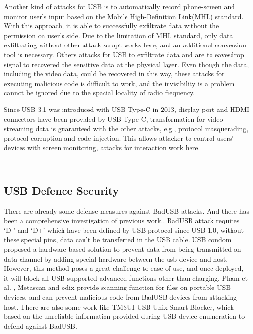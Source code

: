 Another kind of attacks for USB \cite{JFC} is to automatically record phone-screen and monitor user's input based on  the Mobile High-Definition Link(MHL) standard. With this approach, it is able to successfully exfiltrate data without the permission on user's side. Due to the limitation of MHL standard, only data exfiltrating without other attack scropt works here, and an additional conversion tool is necessary. Others attacks for USB to exfiltrate data\cite{smartphone}\cite{poweremi} and \cite{usbdriver} are to eavesdrop signal to recovered the sensitive data at the physical layer. Even though the data, including the video data, could be recovered in this way, these attacks for executing malicious code is difficult to work, and the invisibility is a problem cannot be ignored due to the spacial locality of radio frequency. 



Since USB 3.1 was introduced with USB Type-C in 2013, display port and HDMI connectors have been provided by USB Type-C, transformation for video streaming data is guaranteed with the other attacks, e.g., protocol masquerading,  protocol corruption and code injection. This allows attacker to control users' devices with screen monitoring, attacks for interaction work here.



\\

\subsection{USB Defence Security}
There are already some defense measures against BadUSB attacks. 
And there has been a comprehensive investigation of previous work.\cite{sok}.
BadUSB attack requires `D-' and `D+' which have been defined by USB protocol since USB 1.0\cite{usb10},
without these special pins, data can't be transferred in the USB cable. USB condom \cite{Condom} proposed a hardware-based solution to prevent data from being transmitted on data channel by adding special hardware between the usb device and host.
However, this method poses a great challenge to ease of use, and once deployed, it will block all USB-supported advanced functions other than charging. Pham et al. \cite{pham2010optimizing}, Metascan \cite{OPSWAT} and odix\cite{OLEA} provide scanning function for files on portable USB devices, and can prevent malicious code from BadUSB devices from attacking host.
There are also some work like TMSUI\cite{yang2015tmsui} USB
Unix Smart Blocker\cite{diwan2014complete}, which based on the unreliable information provided during USB device enumeration to defend against BadUSB.

